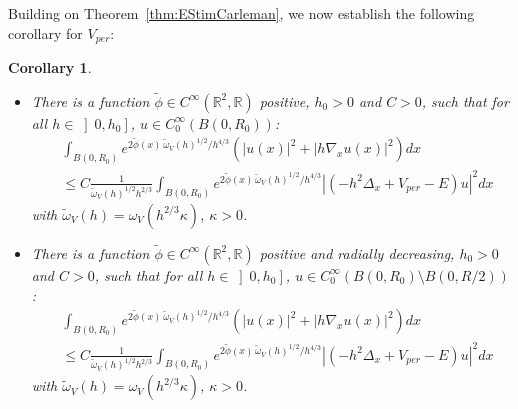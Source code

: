\documentclass[leqno,11pt,letterpaper, english]{amsart}
\newcommand{\nn}{\nonumber}
\theoremstyle{plain}
\newtheorem{cor}[prop]{Corollary}
\theoremstyle{definition}
\numberwithin{equation}{section}
\begin{document}
Building on Theorem~\ref{thm:EStimCarleman}, we now establish the following corollary for \( V_{per} \):

\begin{cor}
\label{cor: cor1}
\hfill\\
\begin{itemize}
\item There is a function $\tilde{\phi} \in C^\infty(\mathbb{R}^2,\mathbb{R})$ positive, $h_0 >0 $ and $C>0$, such that for all $ h\in \left]0, h_0 \right]$, $u \in C_0^\infty(B(0,R_0))$:
\begin{align}
    &\int_{B(0,R_0)} e^{2\tilde{\phi}(x)\,\tilde{\omega}_V(h)^{1/2}/ h^{4/3}} (|u(x)|^2 +|h\nabla_x u(x)|^2)dx\nn\\
    &\leq C \frac{1}{\tilde{\omega}_V(h)^{1/2}h^{2/3}}\int_{B(0,R_0)} e^{2\tilde{\phi}(x)\,\tilde{\omega}_V(h)^{1/2}/ h^{4/3}}|(-h^2\Delta_x + V_{per}- E)u|^2dx
\end{align}
with $\tilde{\omega}_V(h)=\omega_V( h^{2/3}\kappa)$, $\kappa>0$.
 
\item There is a function $\tilde{\phi} \in C^\infty(\mathbb{R}^2,\mathbb{R})$ positive and radially decreasing, $h_0 >0 $ and $C>0$, such that for all $ h\in \left]0, h_0 \right]$, $u \in C_0^\infty(B(0,R_0)\setminus B(0,R/2))$:
\begin{align}
    &\int_{B(0,R_0)} e^{2\tilde{\phi}(x)\,\tilde{\omega}_V(h)^{1/2}/ h^{4/3}} (|u(x)|^2 +|h\nabla_x u(x)|^2)dx\nn\\
    &\leq C \frac{1}{\tilde{\omega}_V(h)^{1/2}h^{2/3}}\int_{B(0,R_0)} e^{2\tilde{\phi}(x)\,\tilde{\omega}_V(h)^{1/2}/ h^{4/3}}|(-h^2\Delta_x + V_{per}- E)u|^2dx
\end{align}
with $\tilde{\omega}_V(h)=\omega_V( h^{2/3}\kappa)$, $\kappa>0$.
\end{itemize}
\end{cor}
\end{document}
